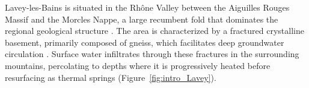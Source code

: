 \FloatBarrier %


Lavey-les-Bains is situated in the Rhône Valley between the Aiguilles Rouges Massif and the Morcles Nappe, a large recumbent fold that dominates the regional geological structure \citep{gouffon2024tectonic}.
The area is characterized by a fractured crystalline basement, primarily composed of gneiss, which facilitates deep groundwater circulation \citep{swisstopo2024lavey1, bianchetti1994hydrogeologie, sonney2009numerical}.
Surface water infiltrates through these fractures in the surrounding mountains, percolating to depths where it is progressively heated before resurfacing as thermal springs (Figure~\ref{fig:intro_Lavey}).

